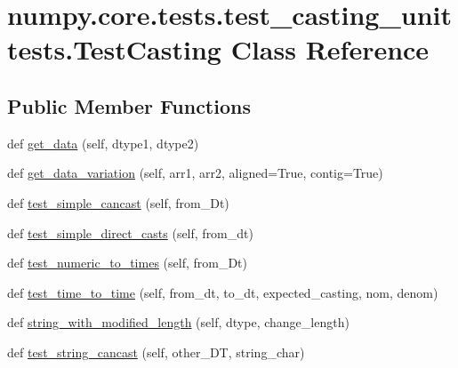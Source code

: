 \hypertarget{classnumpy_1_1core_1_1tests_1_1test__casting__unittests_1_1TestCasting}{}\section{numpy.\+core.\+tests.\+test\+\_\+casting\+\_\+unittests.\+Test\+Casting Class Reference}
\label{classnumpy_1_1core_1_1tests_1_1test__casting__unittests_1_1TestCasting}
\subsection*{Public Member Functions}
\begin{DoxyCompactItemize}
\item 
def \hyperlink{classnumpy_1_1core_1_1tests_1_1test__casting__unittests_1_1TestCasting_abd21336e1b94a3e7bac6c3f1f88ee9fe}{get\+\_\+data} (self, dtype1, dtype2)
\item 
def \hyperlink{classnumpy_1_1core_1_1tests_1_1test__casting__unittests_1_1TestCasting_a7fcdc05d66a7dcf9638910f367681c48}{get\+\_\+data\+\_\+variation} (self, arr1, arr2, aligned=True, contig=True)
\item 
def \hyperlink{classnumpy_1_1core_1_1tests_1_1test__casting__unittests_1_1TestCasting_a1da97e5da105184edee7225a9f3a3fea}{test\+\_\+simple\+\_\+cancast} (self, from\+\_\+\+Dt)
\item 
def \hyperlink{classnumpy_1_1core_1_1tests_1_1test__casting__unittests_1_1TestCasting_ae531e64ab1576530a8767d1e3eaf75b2}{test\+\_\+simple\+\_\+direct\+\_\+casts} (self, from\+\_\+dt)
\item 
def \hyperlink{classnumpy_1_1core_1_1tests_1_1test__casting__unittests_1_1TestCasting_abff79e2fdf94b0c34f1258af7d7839da}{test\+\_\+numeric\+\_\+to\+\_\+times} (self, from\+\_\+\+Dt)
\item 
def \hyperlink{classnumpy_1_1core_1_1tests_1_1test__casting__unittests_1_1TestCasting_af9e94874f5e8793e9a4ccd5963c39bab}{test\+\_\+time\+\_\+to\+\_\+time} (self, from\+\_\+dt, to\+\_\+dt, expected\+\_\+casting, nom, denom)
\item 
def \hyperlink{classnumpy_1_1core_1_1tests_1_1test__casting__unittests_1_1TestCasting_a50392797e987bc6667c1ab9b5464bd5b}{string\+\_\+with\+\_\+modified\+\_\+length} (self, dtype, change\+\_\+length)
\item 
def \hyperlink{classnumpy_1_1core_1_1tests_1_1test__casting__unittests_1_1TestCasting_a118df3df89281f94edcf556ecec4884c}{test\+\_\+string\+\_\+cancast} (self, other\+\_\+\+DT, string\+\_\+char)

\end{DoxyCompactItemize}
